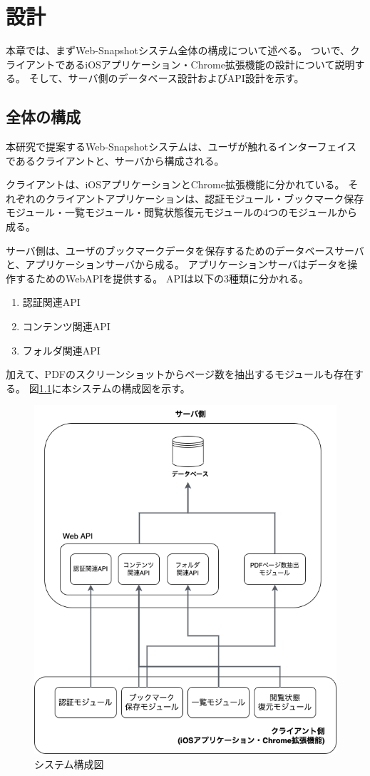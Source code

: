 \chapter{設計}
\label{chap:design}
本章では、まずWeb-Snapshotシステム全体の構成について述べる。
ついで、クライアントであるiOSアプリケーション・Chrome拡張機能の設計について説明する。
そして、サーバ側のデータベース設計およびAPI設計を示す。

\section{全体の構成}
本研究で提案するWeb-Snapshotシステムは、ユーザが触れるインターフェイスであるクライアントと、サーバから構成される。

クライアントは、iOSアプリケーションとChrome拡張機能に分かれている。
それぞれのクライアントアプリケーションは、認証モジュール・ブックマーク保存モジュール・一覧モジュール・閲覧状態復元モジュールの4つのモジュールから成る。

サーバ側は、ユーザのブックマークデータを保存するためのデータベースサーバと、アプリケーションサーバから成る。
アプリケーションサーバはデータを操作するためのWebAPIを提供する。
APIは以下の3種類に分かれる。

\begin{enumerate}
   \item 認証関連API
   \item コンテンツ関連API
   \item フォルダ関連API
\end{enumerate}

加えて、PDFのスクリーンショットからページ数を抽出するモジュールも存在する。
図\ref{fig:design-system-overall}に本システムの構成図を示す。

\begin{figure}[htbp]
  \label{fig:design-system-overall}
  \begin{center}
    \includegraphics[bb=0 0 592 681,width=15cm]{img/040_design/design-system-overall.pdf}
  \end{center}
  \caption{システム構成図}
\end{figure}


